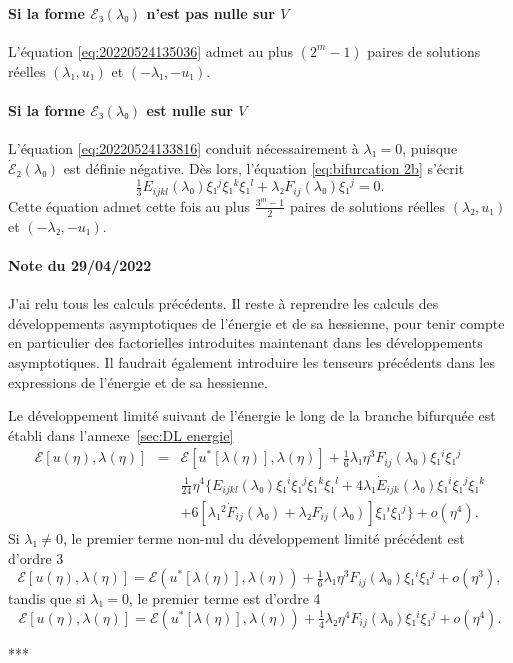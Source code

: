 \documentclass[12pt, final]{amsart}
\theoremstyle{definition}
\begin{document}
\paragraph{Si la forme \(ℰ₃(λ₀)\) n'est pas nulle sur \(V\)} L'équation
\eqref{eq:20220524135036} admet au plus \((2^m - 1)\) paires de solutions
réelles \((λ₁, u₁)\) et \((- λ₁, - u₁)\). 

\paragraph{Si la forme \(ℰ₃(λ₀)\) est nulle sur \(V\)} L'équation
\eqref{eq:20220524133816} conduit nécessairement à \(λ₁ = 0\), puisque
\(\dot{ℰ}₂(λ₀)\) est définie négative. Dès lors, l'équation
\eqref{eq:bifurcation 2b} s'écrit 
\begin{equation}
 \tfrac{1}{3} E_{ijkl}(λ₀) ξ₁^j ξ₁^k ξ₁^l + λ₂ F_{ij}(λ₀) ξ₁^j = 0.
\end{equation}
Cette équation admet cette fois au plus \(\frac{3^m - 1}{2}\) paires de
solutions réelles \((λ₂, u₁)\) et \((- λ₂, - u₁)\). 

\paragraph{Note du 29/04/2022}J'ai relu tous les calculs précédents. Il reste à reprendre les calculs des développements asymptotiques de l'énergie et de sa hessienne, pour tenir compte en particulier des factorielles introduites maintenant dans les développements asymptotiques. Il faudrait également introduire les tenseurs précédents dans les expressions de l'énergie et de sa hessienne.

Le développement limité suivant de l'énergie le long de la branche bifurquée est établi dans l'annexe~\ref{sec:DL energie}
\begin{eqnarray}
 ℰ [u(η), λ(η)] & = & ℰ [u^{\ast} [λ
 (η)], λ(η)] + \tfrac{1}{6} λ₁ η^3 F_{i j}
 (λ₀) ξ₁^i ξ₁^j \nonumber\\
 & & \tfrac{1}{24} η^4 \{ E_{i j k l}
 (λ₀) ξ₁^i ξ₁^j ξ₁^k ξ₁^l + 4 λ₁ \dot{E}_{i
  j k}(λ₀) ξ₁^i ξ₁^j ξ₁^k
 \nonumber\\
 & & + 6 [λ₁^2 \dot{F}_{i j}
 (λ₀) + λ₂ F_{i j}(λ₀)] ξ₁^i ξ₁^j \}
 + o(η^4) . \label{eq:DL energie}
\end{eqnarray}
Si \(λ₁ \neq 0\), le premier terme non-nul du développement limité précédent est d'ordre 3
\begin{equation}
 ℰ [u(η), λ(η)] =ℰ(u^{\ast} [λ
 (η)], λ(η)) + \tfrac{1}{6} λ₁ η^3 F_{i j}
 (λ₀) ξ₁^i ξ₁^j + o(η^3),
\end{equation}
tandis que si \(λ₁ = 0\), le premier terme est d'ordre 4
\begin{equation}
 ℰ [u(η), λ(η)] =ℰ(u^{\ast} [λ
 (η)], λ(η)) + \tfrac{1}{4} λ₂ η^4 F_{i j}
 (λ₀) ξ₁^i ξ₁^j + o(η^4) .
\end{equation}
\begin{center}
 ***
\end{center}
\end{document}

